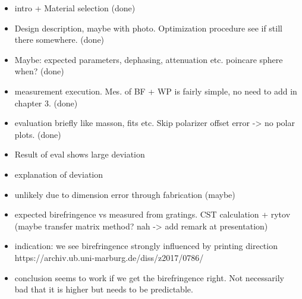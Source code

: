 \begin{itemize}
    \item intro + Material selection (done)
    \item Design description, maybe with photo. Optimization procedure see if still there somewhere. (done)
    \item Maybe: expected parameters, dephasing, attenuation etc. poincare sphere when? (done)
    \item measurement execution. Mes. of BF + WP is fairly simple, no need to add in chapter 3. (done)
    \item evaluation briefly like masson, fits etc. Skip polarizer offset error -> no polar plots. (done)
    \item Result of eval shows large deviation
    \item explanation of deviation
    \item unlikely due to dimension error through fabrication (maybe)
    \item expected birefringence vs measured from gratings. CST calculation + rytov (maybe transfer matrix method? nah -> add remark at presentation)
    \item indication: we see birefringence strongly influenced by printing direction https://archiv.ub.uni-marburg.de/diss/z2017/0786/ 
    \item conclusion seems to work if we get the birefringence right. Not necessarily bad that it is higher but needs to be predictable. 
\end{itemize}




